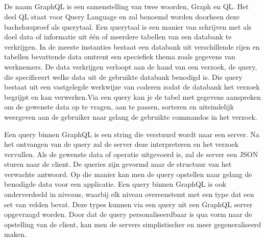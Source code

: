 \subsection{}%
\label{sec:Querytaal}
De naam GraphQL is een samenstelling van twee woorden, Graph en QL. Het deel QL staat voor Query Language en zal benoemd worden doorheen deze bachelorsproef als querytaal. Een querytaal is een manier van schrijven met als doel data of informatie uit één of meerdere tabellen van een databank te verkrijgen. In de meeste instanties bestaat een databank uit verschillende rijen en tabellen bevattende data omtrent een speciefiek thema zoals gegevens van werknemers. De data verkrijgen verloopt aan de hand van een verzoek, de query, die specificeert welke data uit de gebruikte databank benodigd is. Die query bestaat uit een vastgelegde werkwijze van coderen zodat de databank het verzoek begrijpt en kan verwerken.Via een query kan je de tabel met gegevens aanspreken om de gewenste data op te vragen, aan te passen, sorteren en uiteindelijk weergeven aan de gebruiker naar gelang de gebruikte commandos in het verzoek.

Een query binnen GraphQL is een string die verstuurd wordt naar een server. Na het ontvangen van de query zal de server deze interpreteren en het verzoek vervullen. Als de gewenste data of operatie uitgevoerd is, zal de server een JSON sturen naar de client. De queries zijn gevormd naar de structuur van het verwachte antwoord. Op die manier kan men de query opstellen naar gelang de benodigde data voor een applicatie. Een query binnen GraphQL is ook onderverdeeld in niveaus, waarbij elk niveau overeenstemt met een type dat een set van velden bevat. Deze types kunnen via een query uit een GraphQL server opgevraagd worden. Door dat de query personaliseerdbaar is qua vorm naar de opstelling van de client, kan men de servers simplistischer en meer gegeneraliseerd maken.\autocite{Byron2015}

